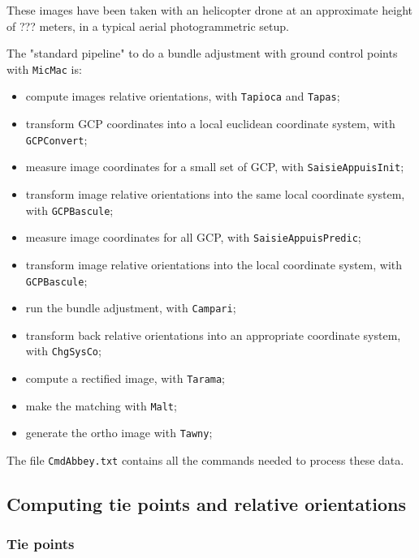 These images have been taken with an helicopter drone at an approximate height of ??? meters, in a typical aerial photogrammetric setup.

\vspace{\baselineskip}
The "standard pipeline" to do a bundle adjustment with ground control points with {\tt MicMac} is:
\begin{itemize}
\item compute images relative orientations, with {\tt Tapioca} and {\tt Tapas};
\item transform GCP coordinates into a local euclidean coordinate system, with {\tt GCPConvert};
\item measure image coordinates for a small set of GCP, with {\tt SaisieAppuisInit};
\item transform image relative orientations into the same local coordinate system, with {\tt GCPBascule};
\item measure image coordinates for all GCP, with {\tt SaisieAppuisPredic};
\item transform image relative orientations into the local coordinate system, with {\tt GCPBascule};
\item run the bundle adjustment, with {\tt Campari};
\item transform back relative orientations into an appropriate coordinate system, with {\tt ChgSysCo};
\item compute a rectified image, with {\tt Tarama};
\item make the matching with {\tt Malt};
\item generate the ortho image with {\tt Tawny};
\end{itemize}

\vspace{\baselineskip}
The file {\tt CmdAbbey.txt} contains all the commands needed to process these data.



\subsection{Computing tie points and relative orientations}


\subsubsection{Tie points}

